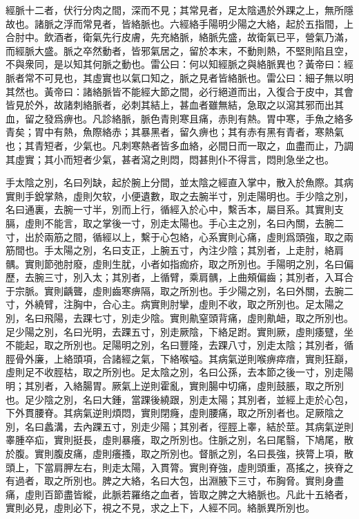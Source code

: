 \documentclass[12pt]{ctexbook}%
\begin{document}
\begin{yuanwen}
經脈十二者，伏行分肉之間，深而不見；其常見者，足太陰遇於外踝之上，無所隱故也。諸脈之浮而常見者，皆絡脈也。六經絡手陽明少陽之大絡，起於五指間，上合肘中。飲酒者，衛氣先行皮膚，先充絡脈，絡脈先盛，故衛氣已平，營氣乃滿，而經脈大盛。脈之卒然動者，皆邪氣居之，留於本末，不動則熱，不堅則陷且空，不與衆同，是以知其何脈之動也。雷公曰：何以知經脈之與絡脈異也？黃帝曰：經脈者常不可見也，其虛實也以氣口知之，脈之見者皆絡脈也。雷公曰：細子無以明其然也。黃帝曰：諸絡脈皆不能經大節之間，必行絕道而出，入復合于皮中，其會皆見於外，故諸刺絡脈者，必刺其結上，甚血者雖無結，急取之以瀉其邪而出其血，留之發爲痹也。凡診絡脈，脈色青則寒且痛，赤則有熱。胃中寒，手魚之絡多青矣；胃中有熱，魚際絡赤；其暴黑者，留久痹也；其有赤有黑有青者，寒熱氣也；其青短者，少氣也。凡刺寒熱者皆多血絡，必間日而一取之，血盡而止，乃調其虛實；其小而短者少氣，甚者瀉之則悶，悶甚則仆不得言，悶則急坐之也。

手太陰之別，名曰列缺，起於腕上分間，並太陰之經直入掌中，散入於魚際。其病實則手銳掌熱，虛則欠软，小便遺數，取之去腕半寸，別走陽明也。手少陰之別，名曰通裏，去腕一寸半，別而上行，循經入於心中，繫舌本，屬目系。其實則支膈，虛則不能言，取之掌後一寸，別走太陽也。手心主之別，名曰內關，去腕二寸，出於兩筋之間，循經以上，繫于心包絡，心系實則心痛，虛則爲頭強，取之兩筋間也。手太陽之別，名曰支正，上腕五寸，內注少陰；其別者，上走肘，絡肩髃。實則節弛肘廢，虛則生肬，小者如指痂疥，取之所別也。手陽明之別，名曰偏歷，去腕三寸，別入太；其別者，上循臂，乘肩髃，上曲頰偏齒；其別者，入耳合于宗脈。實則齲聾，虛則齒寒痹隔，取之所別也。手少陽之別，名曰外關，去腕二寸，外繞臂，注胸中，合心主。病實則肘攣，虛則不收，取之所別也。足太陽之別，名曰飛陽，去踝七寸，別走少陰。實則鼽窒頭背痛，虛則鼽衄，取之所別也。足少陽之別，名曰光明，去踝五寸，別走厥陰，下絡足跗。實則厥，虛則痿躄，坐不能起，取之所別也。足陽明之別，名曰豐隆，去踝八寸，別走太陰；其別者，循脛骨外廉，上絡頭項，合諸經之氣，下絡喉嗌。其病氣逆則喉痹瘁瘖，實則狂巔，虛則足不收脛枯，取之所別也。足太陰之別，名曰公孫，去本節之後一寸，別走陽明；其別者，入絡腸胃。厥氣上逆則霍亂，實則腸中切痛，虛則鼓脹，取之所別也。足少陰之別，名曰大鍾，當踝後繞跟，別走太陽；其別者，並經上走於心包，下外貫腰脊。其病氣逆則煩悶，實則閉癃，虛則腰痛，取之所別者也。足厥陰之別，名曰蠡溝，去內踝五寸，別走少陽；其別者，徑脛上睾，結於莖。其病氣逆則睾腫卒疝，實則挺長，虛則暴癢，取之所別也。住脈之別，名曰尾翳，下鳩尾，散於腹。實則腹皮痛，虛則癢搔，取之所別也。督脈之別，名曰長強，挾膂上項，散頭上，下當肩胛左右，則走太陽，入貫膂。實則脊強，虛則頭重，髙搖之，挾脊之有過者，取之所別也。脾之大絡，名曰大包，出淵腋下三寸，布胸脅。實則身盡痛，虛則百節盡皆縱，此脈若羅络之血者，皆取之脾之大絡脈也。凡此十五絡者，實則必見，虛則必下，視之不見，求之上下，人經不同。絡脈異所別也。
\end{yuanwen}
\end{document}
